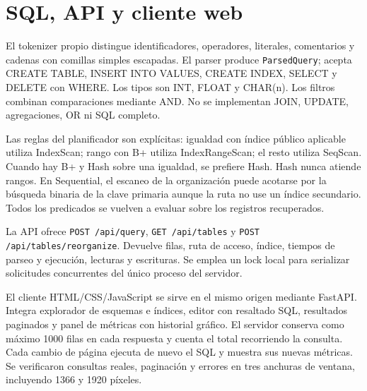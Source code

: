 \section{SQL, API y cliente web}
El tokenizer propio distingue identificadores, operadores, literales, comentarios y cadenas con comillas simples escapadas. El parser produce \texttt{ParsedQuery}; acepta CREATE TABLE, INSERT INTO VALUES, CREATE INDEX, SELECT y DELETE con WHERE. Los tipos son INT, FLOAT y CHAR(n). Los filtros combinan comparaciones mediante AND. No se implementan JOIN, UPDATE, agregaciones, OR ni SQL completo.

Las reglas del planificador son explícitas: igualdad con índice público aplicable utiliza IndexScan; rango con B+ utiliza IndexRangeScan; el resto utiliza SeqScan. Cuando hay B+ y Hash sobre una igualdad, se prefiere Hash. Hash nunca atiende rangos. En Sequential, el escaneo de la organización puede acotarse por la búsqueda binaria de la clave primaria aunque la ruta no use un índice secundario. Todos los predicados se vuelven a evaluar sobre los registros recuperados.

La API ofrece \texttt{POST /api/query}, \texttt{GET /api/tables} y \texttt{POST /api/tables/reorganize}. Devuelve filas, ruta de acceso, índice, tiempos de parseo y ejecución, lecturas y escrituras. Se emplea un lock local para serializar solicitudes concurrentes del único proceso del servidor.

El cliente HTML/CSS/JavaScript se sirve en el mismo origen mediante FastAPI. Integra explorador de esquemas e índices, editor con resaltado SQL, resultados paginados y panel de métricas con historial gráfico. El servidor conserva como máximo 1000 filas en cada respuesta y cuenta el total recorriendo la consulta. Cada cambio de página ejecuta de nuevo el SQL y muestra sus nuevas métricas. Se verificaron consultas reales, paginación y errores en tres anchuras de ventana, incluyendo 1366 y 1920 píxeles.
